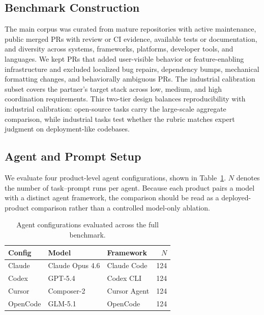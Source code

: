 \subsection{Benchmark Construction}
\label{sec:benchmark-construction}

The main corpus was curated from mature repositories with active maintenance, public merged PRs with review or CI evidence, available tests or documentation, and diversity across systems, frameworks, platforms, developer tools, and languages. We kept PRs that added user-visible behavior or feature-enabling infrastructure and excluded localized bug repairs, dependency bumps, mechanical formatting changes, and behaviorally ambiguous PRs. The industrial calibration subset covers the partner's target stack across low, medium, and high coordination requirements. This two-tier design balances reproducibility with industrial calibration: open-source tasks carry the large-scale aggregate comparison, while industrial tasks test whether the rubric matches expert judgment on deployment-like codebases.

\subsection{Agent and Prompt Setup}
\label{sec:configs}
\label{sec:prompts}

We evaluate four product-level agent configurations, shown in Table~\ref{tab:configs}. $N$ denotes the number of task--prompt runs per agent. Because each product pairs a model with a distinct agent framework, the comparison should be read as a deployed-product comparison rather than a controlled model-only ablation.

\begin{table}[t]
  \caption{Agent configurations evaluated across the full benchmark.}
  \label{tab:configs}
  \centering
  \small
  \begin{tabular}{lllr}
    \toprule
    \textbf{Config} & \textbf{Model} & \textbf{Framework} & \textbf{$N$} \\
    \midrule
    Claude  & Claude Opus 4.6  & Claude Code & 124 \\
    Codex   & GPT-5.4          & Codex CLI   & 124 \\
    Cursor  & Composer-2       & Cursor Agent & 124 \\
    OpenCode & GLM-5.1         & OpenCode    & 124 \\
    \bottomrule
  \end{tabular}
\end{table}

